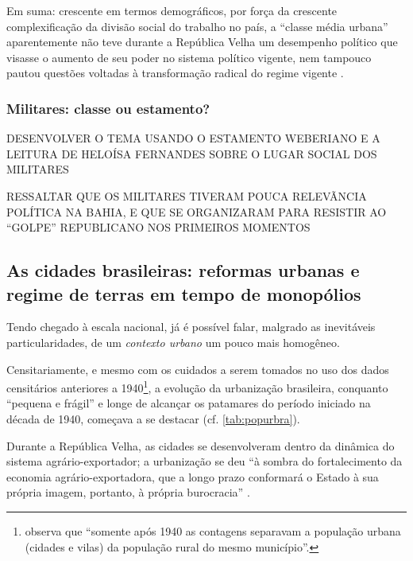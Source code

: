 Em suma: crescente em termos demográficos, por força da crescente complexificação da divisão social do trabalho no país, a ``classe média urbana'' aparentemente não teve durante a República Velha um desempenho político que visasse o aumento de seu poder no sistema político vigente, nem tampouco pautou questões voltadas à transformação radical do regime vigente \cite[p.~36]{pinheiro_clamed_1977}.

\subsubsection{Militares: classe ou estamento?}\label{subsubsec:milclaest}

DESENVOLVER O TEMA USANDO O ESTAMENTO WEBERIANO E A LEITURA DE HELOÍSA FERNANDES SOBRE O LUGAR SOCIAL DOS MILITARES

RESSALTAR QUE OS MILITARES TIVERAM POUCA RELEVÃNCIA POLÍTICA NA BAHIA, E QUE SE ORGANIZARAM PARA RESISTIR AO ``GOLPE'' REPUBLICANO NOS PRIMEIROS MOMENTOS

\subsection{As cidades brasileiras: reformas urbanas e regime de terras em tempo de monopólios}\label{subsec:cidbraref}

Tendo chegado à escala nacional, já é possível falar, malgrado as inevitáveis particularidades, de um \textit{contexto urbano} um pouco mais homogêneo.

Censitariamente, e mesmo com os cuidados a serem tomados no uso dos dados censitários anteriores a 1940\footnote{ observa que ``somente após 1940 as contagens separavam a população urbana (cidades e vilas) da população rural do mesmo município''.}, a evolução da urbanização brasileira, conquanto ``pequena e frágil'' \cite[p.~303]{suzigan_polgov_2001} e longe de alcançar os patamares do período iniciado na década de 1940, começava a se destacar (cf. \autoref{tab:popurbra}).



Durante a República Velha, as cidades se desenvolveram dentro da dinâmica do sistema agrário-exportador; a urbanização se deu ``à sombra do fortalecimento da economia agrário-exportadora, que a longo prazo conformará o Estado à sua própria imagem, portanto, à própria burocracia''  \cite[p.~22-23]{pinheiro_clamed_1977}.

